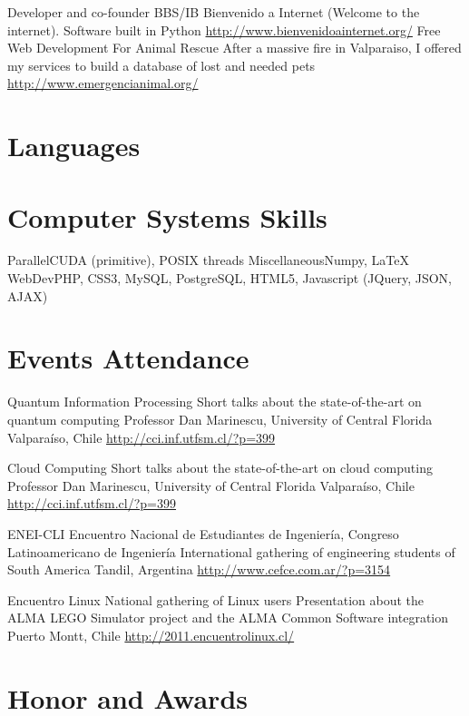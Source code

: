 \documentclass[11pt,a4paper,sans]{moderncv}
\begin{document}
        {Developer and co-founder}
        {BBS/IB Bienvenido a Internet (Welcome to the internet). Software built in Python}
        {}
        {}
        {\url{http://www.bienvenidoainternet.org/}}
        {Free Web Development For Animal Rescue}
        {After a massive fire in Valparaiso, I offered my services to build a database of lost and needed pets}
        {}
        {}
        {\url{http://www.emergencianimal.org/}}

\section{Languages}

\section{Computer Systems Skills}
           {Parallel}{CUDA (primitive), POSIX threads}
           {Miscellaneous}{Numpy, \LaTeX}
           {WebDev}{PHP, CSS3, MySQL, PostgreSQL, HTML5, Javascript (JQuery, JSON, AJAX)}

\section{Events Attendance}

        {Quantum Information Processing}
        {Short talks about the state-of-the-art on quantum computing}
        {Professor Dan Marinescu, University of Central Florida}
        {Valparaíso, Chile}
        {\url{http://cci.inf.utfsm.cl/?p=399}}

        {Cloud Computing}
        {Short talks about the state-of-the-art on cloud computing}
        {Professor Dan Marinescu, University of Central Florida}
        {Valparaíso, Chile}
        {\url{http://cci.inf.utfsm.cl/?p=399}}

        {ENEI-CLI}
        {Encuentro Nacional de Estudiantes de Ingeniería, Congreso Latinoamericano de Ingeniería}
        {International gathering of engineering students of South America}
        {Tandil, Argentina \url{http://www.cefce.com.ar/?p=3154}}
        {}

        {Encuentro Linux}
        {National gathering of Linux users}
        {Presentation about the ALMA LEGO Simulator project and the ALMA Common Software integration}
        {Puerto Montt, Chile}
        {\url{http://2011.encuentrolinux.cl/}}

\section{Honor and Awards}

\end{document}
